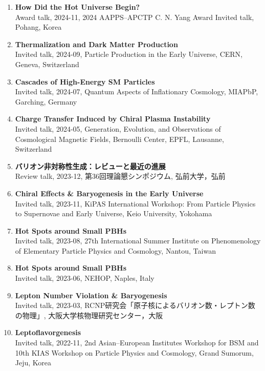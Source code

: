 \begin{enumerate}
\item \textbf{How Did the Hot Universe Begin?}\\ Award talk, 2024-11, 2024 AAPPS--APCTP C. N. Yang Award Invited talk, Pohang, Korea

\item \textbf{Thermalization and Dark Matter Production}\\ Invited talk, 2024-09, Particle Production in the Early Universe, CERN, Geneva, Switzerland

\item \textbf{Cascades of High-Energy SM Particles}\\ Invited talk, 2024-07, Quantum Aspects of Inflationary Cosmology, MIAPbP, Garching, Germany

\item \textbf{Charge Transfer Induced by Chiral Plasma Instability}\\ Invited talk, 2024-05, Generation, Evolution, and Observations of Cosmological Magnetic Fields, Bernoulli Center, EPFL, Lausanne, Switzerland

\item \textbf{バリオン非対称性生成：レビューと最近の進展}\\ Review talk, 2023-12, 第36回理論懇シンポジウム, 弘前大学，弘前

\item \textbf{Chiral Effects \& Baryogenesis in the Early Universe}\\ Invited talk, 2023-11, KiPAS International Workshop: From Particle Physics to Supernovae and Early Universe, Keio University, Yokohama

\item \textbf{Hot Spots around Small PBHs}\\ Invited talk, 2023-08, 27th International Summer Institute on Phenomenology of Elementary Particle Physics and Cosmology, Nantou, Taiwan

\item \textbf{Hot Spots around Small PBHs}\\ Invited talk, 2023-06, NEHOP, Naples, Italy

\item \textbf{Lepton Number Violation \& Baryogenesis}\\ Invited talk, 2023-03, RCNP研究会「原子核によるバリオン数・レプトン数の物理」, 大阪大学核物理研究センター，大阪

\item \textbf{Leptoflavorgenesis}\\ Invited talk, 2022-11, 2nd Asian--European Institutes Workshop for BSM and 10th KIAS Workshop on Particle Physics and Cosmology, Grand Sumorum, Jeju, Korea


\end{enumerate}
